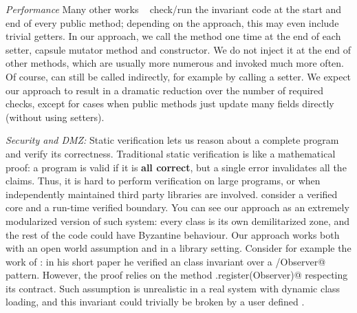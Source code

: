 \noindent\textit{Performance}
Many other works%
~\cite{feldman2006jose,fahndrich2010embedded,abercrombie2002jcontractor,tran2003design}
 check/run
the invariant code at the start and end of every public
method; depending on the approach, this may even include trivial getters.
In  our approach, we call the \validate method
one time at the end of each setter, capsule mutator method and constructor.
We do not inject it at the end of other methods, which are usually more numerous and invoked much more often.
Of course, \validate can still be called indirectly, for example by calling a setter.
We expect our approach to result in a dramatic reduction over the number of required checks,
except for cases when public methods just update many fields directly (without using setters).







\noindent\textit{Security and DMZ:}
Static verification lets us reason about a complete program
and verify its correctness.
Traditional static verification is like a mathematical proof: a program is valid if it is \textbf{all correct},
but a single error invalidates all the claims.
Thus, it is hard to perform verification on large programs, or when independently
maintained third party libraries are involved.
 consider a verified core
and a run-time verified boundary.
You can see our approach as an extremely modularized version of such system:
every class is its own demilitarized zone, and the rest of the code 
could have Byzantine behaviour.
Our approach works both with an open world assumption and in a library setting.
Consider for example the work of :
in his short paper he verified an \Q@Observer@ class invariant over
a \Q@Subject/Observer@ pattern.
However, the proof relies on the method \Q@Subject.register(Observer)@ respecting its contract.
Such assumption is unrealistic in a real system with dynamic class loading,
and this invariant could trivially be broken by a user defined \Q@EvilSubject@.


